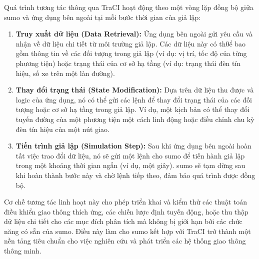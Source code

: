 Quá trình tương tác thông qua TraCI hoạt động theo một vòng lặp đồng bộ giữa \ac{sumo}
và ứng dụng bên ngoài tại mỗi bước thời gian của giả lập:
\begin{enumerate}
    \item \textbf{Truy xuất dữ liệu (Data Retrieval):} Ứng dụng bên ngoài gửi
        yêu cầu và nhận về dữ liệu chi tiết từ môi trường giả lập. Các dữ liệu này
        có th0ể bao gồm thông tin về các đối tượng trong giả lập (ví dụ: vị trí,
        tốc độ của từng phương tiện) hoặc trạng thái của cơ sở hạ tầng (ví dụ: trạng
        thái đèn tín hiệu, số xe trên một làn đường).

    \item \textbf{Thay đổi trạng thái (State Modification):} Dựa trên dữ liệu
        thu được và logic của ứng dụng, nó có thể gửi các lệnh để thay đổi trạng
        thái của các đối tượng hoặc cơ sở hạ tầng trong giả lập. Ví dụ, một kịch
        bản có thể thay đổi tuyến đường của một phương tiện một cách linh động hoặc
        điều chỉnh chu kỳ đèn tín hiệu của một nút giao.

    \item \textbf{Tiến trình giả lập (Simulation Step):} Sau khi ứng dụng bên
        ngoài hoàn tất việc trao đổi dữ liệu, nó sẽ gửi một lệnh cho \ac{sumo}
        để tiến hành giả lập trong một khoảng thời gian ngắn (ví dụ, một giây).
        \ac{sumo} sẽ tạm dừng sau khi hoàn thành bước này và chờ lệnh tiếp theo,
        đảm bảo quá trình được đồng bộ.
\end{enumerate}
Cơ chế tương tác linh hoạt này cho phép triển khai và kiểm thử các thuật toán điều
khiển giao thông thích ứng, các chiến lược định tuyến động, hoặc thu thập dữ liệu
chi tiết cho các mục đích phân tích mà không bị giới hạn bởi các chức năng có sẵn
của \ac{sumo}. Điều này làm cho \ac{sumo} kết hợp với TraCI trở thành một nền
tảng tiêu chuẩn cho việc nghiên cứu và phát triển các hệ thống giao thông thông
minh.

